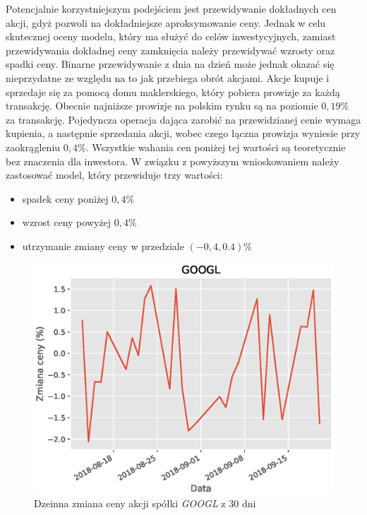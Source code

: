 \documentclass[a4paper, twoside, 11pt, openright]{article}
\begin{document}
Potencjalnie korzystniejszym podejściem jest przewidywanie dokładnych cen akcji, gdyż pozwoli na dokładniejsze aproksymowanie ceny. Jednak w celu skutecznej oceny modelu, który ma służyć do celów inwestycyjnych, zamiast przewidywania dokładnej ceny zamknięcia należy przewidywać wzrosty oraz spadki ceny. Binarne przewidywanie z dnia na dzień może jednak okazać się nieprzydatne ze względu na to jak przebiega obrót akcjami. Akcje kupuje i sprzedaje się za pomocą domu maklerskiego, który pobiera prowizje za każdą transakcję. Obecnie najniższe prowizje na polskim rynku są na poziomie $0,19\%$ za transakcję. Pojedyncza operacja dająca zarobić na przewidzianej cenie wymaga kupienia, a następnie sprzedania akcji, wobec czego łączna prowizja wyniesie przy zaokrągleniu $0,4\%$. Wszystkie wahania cen poniżej tej wartości są teoretycznie bez znaczenia dla inwestora. W związku z powyższym wnioskowaniem należy zastosować model, który przewiduje trzy wartości:
\begin{itemize}
\item spadek ceny poniżej $0,4\%$
\item wzrost ceny powyżej $0,4\%$
\item utrzymanie zmiany ceny w przedziale $(-0,4, 0.4)\%$
\end{itemize}


\begin{figure}[H]
\centering \includegraphics[scale=0.9]{img/linear_regression/l_r_pct_change_last_30}
\caption{Dzeinna zmiana ceny akcji spółki \textit{GOOGL} z 30 dni}
\label{l_r_pct_change_last_30}
\end{figure}
\end{document}
